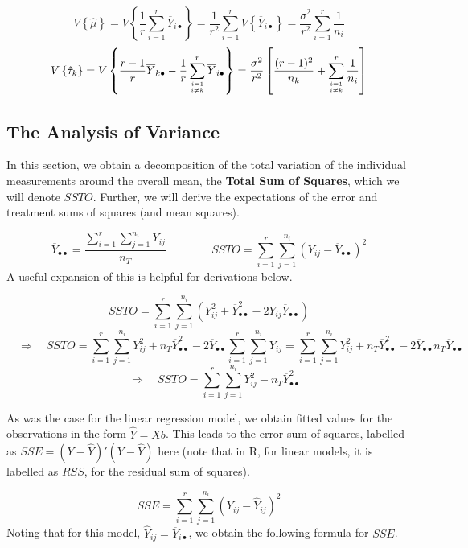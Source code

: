\documentclass[
]{book}
\begin{document}
\[
V\left\{\hat{\mu}\right\} = V\left\{\frac{1}{r}\sum_{i=1}^r \overline{Y}_{i\bullet}\right\}=
\frac{1}{r^2}\sum_{i=1}^rV\left\{\overline{Y}_{i\bullet}\right\}=
\frac{\sigma^2}{r^2}\sum_{i=1}^r\frac{1}{n_i}
\] \[V\left\{\hat{\tau}_k\right\} =
V\left\{\frac{r-1}{r}\overline{Y}_{k\bullet}-\frac{1}{r}\sum_{i=1 \atop i \ne k}^r\overline{Y}_{i\bullet}\right\}=
\frac{\sigma^2}{r^2}\left[
\frac{(r-1)^2}{n_k} + \sum_{i=1 \atop i \ne k}^r\frac{1}{n_i}
\right]
\]

\subsection{The Analysis of Variance}\label{the-analysis-of-variance}

In this section, we obtain a decomposition of the total variation of the
individual measurements around the overall mean, the \textbf{Total Sum
of Squares}, which we will denote \(SSTO\). Further, we will derive the
expectations of the error and treatment sums of squares (and mean
squares).

\[
\overline{Y}_{\bullet\bullet}=
\frac{\sum_{i=1}^r\sum_{j=1}^{n_i}Y_{ij}}{n_T}
\qquad \qquad
SSTO = \sum_{i=1}^r\sum_{j=1}^{n_i}
  \left(Y_{ij}-\overline{Y}_{\bullet\bullet}\right)^2
\] A useful expansion of this is helpful for derivations below.

\[
SSTO = \sum_{i=1}^r\sum_{j=1}^{n_i}
  \left(Y_{ij}^2 + \overline{Y}_{\bullet\bullet}^2
  -2Y_{ij}\overline{Y}_{\bullet\bullet}\right)
\] \[
\quad \Rightarrow \quad
SSTO = \sum_{i=1}^r\sum_{j=1}^{n_i} Y_{ij}^2 +
  n_T\overline{Y}_{\bullet\bullet}^2 -
  2\overline{Y}_{\bullet\bullet}\sum_{i=1}^r\sum_{j=1}^{n_i} Y_{ij}=
  \sum_{i=1}^r\sum_{j=1}^{n_i} Y_{ij}^2 +
  n_T\overline{Y}_{\bullet\bullet}^2 -
  2\overline{Y}_{\bullet\bullet}n_T\overline{Y}_{\bullet\bullet}
  \] \[
  \quad \Rightarrow \quad
SSTO 
  = \sum_{i=1}^r\sum_{j=1}^{n_i} Y_{ij}^2 -
  n_T\overline{Y}_{\bullet\bullet}^2
  \]

As was the case for the linear regression model, we obtain fitted values
for the observations in the form \(\hat{Y}=Xb\). This leads to the error
sum of squares, labelled as
\(SSE=\left(Y-\hat{Y}\right)'\left(Y-\hat{Y}\right)\) here (note that in
R, for linear models, it is labelled as \(RSS\), for the residual sum of
squares).

\[
SSE = \sum_{i=1}^r\sum_{j=1}^{n_i}  \left(Y_{ij}-\hat{Y}_{ij}\right)^2
\] Noting that for this model, \(\hat{Y}_{ij}=\overline{Y}_{i\bullet}\),
we obtain the following formula for \(SSE\).
\end{document}
